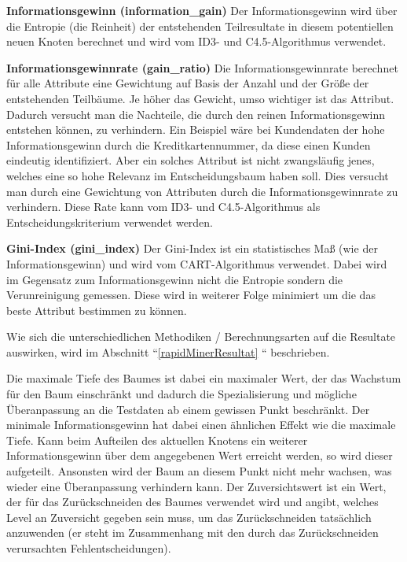 \begin{pitemize}
\item \textbf{Informationsgewinn (information\_gain)} Der Informationsgewinn wird über die Entropie (die Reinheit) der entstehenden Teilresultate in diesem potentiellen neuen Knoten berechnet und wird vom ID3- und C4.5-Algorithmus verwendet.
\item \textbf{Informationsgewinnrate (gain\_ratio)} Die Informationsgewinnrate berechnet für alle Attribute eine Gewichtung auf Basis der Anzahl und der Größe der entstehenden Teilbäume. Je höher das Gewicht, umso wichtiger ist das Attribut. Dadurch versucht man die Nachteile, die durch den reinen Informationsgewinn entstehen können, zu verhindern. Ein Beispiel wäre bei Kundendaten der hohe Informationsgewinn durch die Kreditkartennummer, da diese einen Kunden eindeutig identifiziert. Aber ein solches Attribut ist nicht zwangsläufig jenes, welches eine so hohe Relevanz im Entscheidungsbaum haben soll. Dies versucht man durch eine Gewichtung von Attributen durch die Informationsgewinnrate zu verhindern. Diese Rate kann vom ID3- und C4.5-Algorithmus als Entscheidungskriterium verwendet werden. \cite{rapidminer_rapidminer_2015} \cite{johannes_furnkranz_decision-tree_2008} 
\item \textbf{Gini-Index (gini\_index)} Der Gini-Index ist ein statistisches Maß (wie der Informationsgewinn) und wird vom CART-Algorithmus verwendet. Dabei wird im Gegensatz zum Informationsgewinn nicht die Entropie sondern die Verunreinigung gemessen. Diese wird in weiterer Folge minimiert um die das beste Attribut bestimmen zu können. \cite{johannes_furnkranz_decision-tree_2008}
\end{pitemize}

Wie sich die unterschiedlichen Methodiken / Berechnungsarten auf die Resultate auswirken, wird im Abschnitt ``\ref{rapidMinerResultat} `` beschrieben.

Die maximale Tiefe des Baumes ist dabei ein maximaler Wert, der das Wachstum für den Baum einschränkt und dadurch die Spezialisierung und mögliche Überanpassung an die Testdaten ab einem gewissen Punkt beschränkt. Der minimale Informationsgewinn hat dabei einen ähnlichen Effekt wie die maximale Tiefe. Kann beim Aufteilen des aktuellen Knotens ein weiterer Informationsgewinn über dem angegebenen Wert erreicht werden, so wird dieser aufgeteilt. Ansonsten wird der Baum an diesem Punkt nicht mehr wachsen, was wieder eine Überanpassung verhindern kann. Der Zuversichtswert ist ein Wert, der für das Zurückschneiden des Baumes verwendet wird und angibt, welches Level an Zuversicht gegeben sein muss, um das Zurückschneiden tatsächlich anzuwenden (er steht im Zusammenhang mit den durch das Zurückschneiden verursachten Fehlentscheidungen). \cite{rapidminer_rapidminer_2015}


